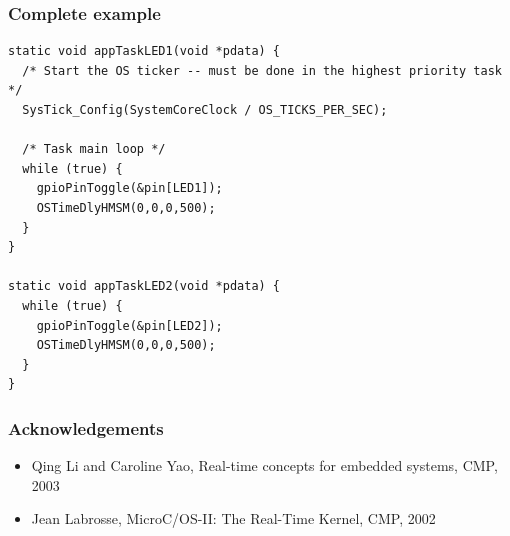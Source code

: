 \documentclass[hyperref={pdfpagelabels=false},svgnames]{beamer}
\begin{document}
\begin{frame}[fragile]
  \frametitle{Complete example}
  \begin{lstlisting}
static void appTaskLED1(void *pdata) {
  /* Start the OS ticker -- must be done in the highest priority task */
  SysTick_Config(SystemCoreClock / OS_TICKS_PER_SEC);
 
  /* Task main loop */
  while (true) {
    gpioPinToggle(&pin[LED1]);
    OSTimeDlyHMSM(0,0,0,500);
  }
}

static void appTaskLED2(void *pdata) {
  while (true) {
    gpioPinToggle(&pin[LED2]);
    OSTimeDlyHMSM(0,0,0,500);
  }
}
\end{lstlisting}

\end{frame}


\begin{frame}
\frametitle{Acknowledgements}
\begin{itemize}
\item Qing Li and Caroline Yao, Real-time concepts for embedded systems, CMP, 2003
\item Jean Labrosse, MicroC/OS-II: The Real-Time Kernel, CMP, 2002
\end{itemize}
\end{frame}
\end{document}
